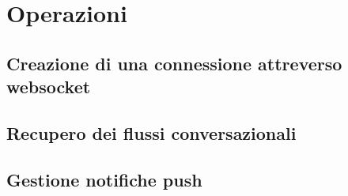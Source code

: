 \section{Operazioni}

\subsection{Creazione di una connessione attreverso websocket}

\subsection{Recupero dei flussi conversazionali}

\subsection{Gestione notifiche push}
